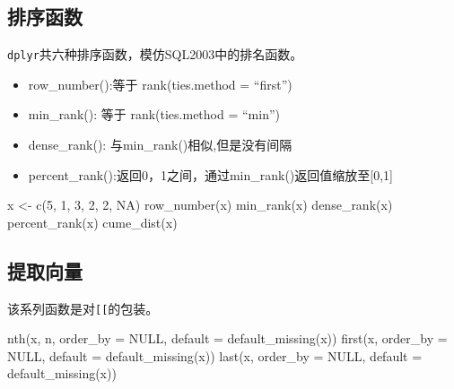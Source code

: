 \documentclass[
]{book}
\newenvironment{Shaded}{\begin{snugshade}}{\end{snugshade}}
\newcommand{\AttributeTok}[1]{\textcolor[rgb]{0.77,0.63,0.00}{#1}}
\newcommand{\ConstantTok}[1]{\textcolor[rgb]{0.00,0.00,0.00}{#1}}
\newcommand{\DecValTok}[1]{\textcolor[rgb]{0.00,0.00,0.81}{#1}}
\newcommand{\FunctionTok}[1]{\textcolor[rgb]{0.00,0.00,0.00}{#1}}
\newcommand{\NormalTok}[1]{#1}
\newcommand{\OtherTok}[1]{\textcolor[rgb]{0.56,0.35,0.01}{#1}}
\providecommand{\tightlist}{%
  \setlength{\itemsep}{0pt}\setlength{\parskip}{0pt}}
\begin{document}
\hypertarget{ux6392ux5e8fux51fdux6570}{%
\subsection{排序函数}\label{ux6392ux5e8fux51fdux6570}}

\texttt{dplyr}共六种排序函数，模仿SQL2003中的排名函数。

\begin{itemize}
\tightlist
\item
  row\_number():等于 rank(ties.method = ``first'')
\item
  min\_rank(): 等于 rank(ties.method = ``min'')
\item
  dense\_rank(): 与min\_rank()相似,但是没有间隔
\item
  percent\_rank():返回0，1之间，通过min\_rank()返回值缩放至{[}0,1{]}
\end{itemize}

\begin{Shaded}
\begin{Highlighting}[]
\NormalTok{x }\OtherTok{\textless{}{-}} \FunctionTok{c}\NormalTok{(}\DecValTok{5}\NormalTok{, }\DecValTok{1}\NormalTok{, }\DecValTok{3}\NormalTok{, }\DecValTok{2}\NormalTok{, }\DecValTok{2}\NormalTok{, }\ConstantTok{NA}\NormalTok{)}
\FunctionTok{row\_number}\NormalTok{(x)}
\FunctionTok{min\_rank}\NormalTok{(x)}
\FunctionTok{dense\_rank}\NormalTok{(x)}
\FunctionTok{percent\_rank}\NormalTok{(x)}
\FunctionTok{cume\_dist}\NormalTok{(x)}
\end{Highlighting}
\end{Shaded}

\hypertarget{ux63d0ux53d6ux5411ux91cf}{%
\subsection{提取向量}\label{ux63d0ux53d6ux5411ux91cf}}

该系列函数是对\texttt{{[}{[}}的包装。

\begin{Shaded}
\begin{Highlighting}[]
\FunctionTok{nth}\NormalTok{(x, n, }\AttributeTok{order\_by =} \ConstantTok{NULL}\NormalTok{, }\AttributeTok{default =} \FunctionTok{default\_missing}\NormalTok{(x))}
\FunctionTok{first}\NormalTok{(x, }\AttributeTok{order\_by =} \ConstantTok{NULL}\NormalTok{, }\AttributeTok{default =} \FunctionTok{default\_missing}\NormalTok{(x))}
\FunctionTok{last}\NormalTok{(x, }\AttributeTok{order\_by =} \ConstantTok{NULL}\NormalTok{, }\AttributeTok{default =} \FunctionTok{default\_missing}\NormalTok{(x))}
\end{Highlighting}
\end{Shaded}
\end{document}

